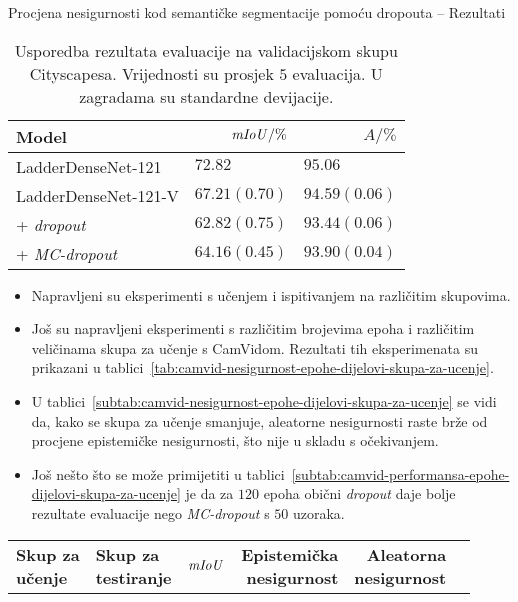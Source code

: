 \documentclass{beamer}
\begin{document}
\begin{frame}[allowframebreaks=0.9]{Procjena nesigurnosti kod semantičke segmentacije pomoću dropouta -- Rezultati}
	\begin{table}
		\centering\small
		\begin{tabular}{lrr}
			\toprule
			\bfseries Model & $\mathit{mIoU}/\%$ & $A/\%$ \\
			\midrule
			LadderDenseNet-121 \citep{Kreso:2017:LSDFSSLNI} & $72.82\phantom{(0.00)}$ & $95.06\phantom{(0.00)}$ \\
			\midrule
			LadderDenseNet-121-V & $67.21(0.70)$ & $94.59(0.06)$ \\
			+ \textit{dropout} & $62.82(0.75)$ & $93.44(0.06)$ \\
			+ \textit{MC-dropout} & $64.16(0.45)$ & $93.90(0.04)$
			\\\bottomrule
		\end{tabular}
		\caption{Usporedba rezultata evaluacije na validacijskom skupu Cityscapesa. Vrijednosti su prosjek $5$ evaluacija. U zagradama su standardne devijacije.}
		\label{tab:evaluacija-cityscapes}
	\end{table}
\begin{itemize}
	\item Napravljeni su eksperimenti s učenjem i ispitivanjem na različitim skupovima.
	\item Još su napravljeni eksperimenti s različitim brojevima epoha i različitim veličinama skupa za učenje s CamVidom. Rezultati tih eksperimenata su prikazani u tablici~\ref{tab:camvid-nesigurnost-epohe-dijelovi-skupa-za-ucenje}.
	\item U tablici~\ref{subtab:camvid-nesigurnost-epohe-dijelovi-skupa-za-ucenje} se vidi da, kako se skupa za učenje smanjuje, aleatorne nesigurnosti raste brže od procjene epistemičke nesigurnosti, što nije u skladu s očekivanjem. 
	\item Još nešto što se može primijetiti u tablici~\ref{subtab:camvid-performansa-epohe-dijelovi-skupa-za-ucenje} je da za $120$ epoha obični \textit{dropout} daje bolje rezultate evaluacije nego \textit{MC-dropout} s $50$ uzoraka.
\end{itemize}
	\begin{table}
		\centering\footnotesize
		\begin{tabular}{llrrrr}
			\toprule
			\bfseries \makecell[l]{Skup za\\ učenje} & \bfseries \makecell[l]{Skup za\\ testiranje} & $\mathit{mIoU}$ & \bfseries \makecell[r]{Epistemička\\ nesigurnost} & \bfseries \makecell[r]{Aleatorna\\ nesigurnost}  & \makecell[r]{$\frac{\text{epistemička}}{\text{aleatorna}}$} \\

\end{tabular}
\end{table}
\end{frame}
\end{document}
